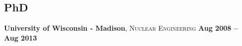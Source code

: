 \documentclass[margin,line]{resume}
\begin{document}
\begin{resume}
    \section{\mysidestyle PhD}
    \textbf{University of Wisconsin - Madison}, \textsc{Nuclear 
        Engineering}\hfill \textbf{ Aug 2008 -- Aug 
        2013}\vspace{-3mm}\\\vspace{-4mm}%

\end{resume}
\end{document}
